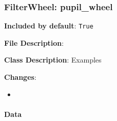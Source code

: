 \subsubsection{FilterWheel: \textquotedbl{}pupil\_wheel\textquotedbl{}%
  \label{filterwheel-pupil-wheel}%
}

\textbf{Included by default}: \texttt{True}

\textbf{File Description}:

\textbf{Class Description}: Examples

\textbf{Changes}:

\begin{itemize}
\item \end{itemize}


\paragraph{Data%
  \label{id7}%
}

\begin{figure}[H]
\noindent{}\label{fig-pupil-wheel}
\end{figure}


